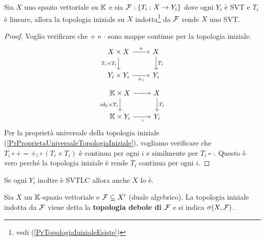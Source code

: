 \begin{proposition}\label{PrTopologiaInizialeCasoSVT}
Sia $X$ uno spazio vettoriale su $\mathbb{K}$ e sia $\mathcal{F}:\left\{{T_i:X\to Y_i}\right\}$ dove ogni $Y_i$ \`e SVT e $T_i$ \`e lineare, allora la topologia iniziale su $X$ indotta\footnote{vedi (\ref{PrTopologiaInizialeEsiste})} da $\mathcal{F}$ rende $X$ uno SVT.
\end{proposition}
\begin{proof}
Voglio verificare che $+$ e $\cdot$ sono mappe continue per la topologia iniziale.
\[\begin{tikzcd}
	{X\times X} & X \\
	{Y_i\times Y_i} & {Y_i}
	\arrow["{+}", from=1-1, to=1-2]
	\arrow["{T_i\times T_i}"', from=1-1, to=2-1]
	\arrow["{T_i}", from=1-2, to=2-2]
	\arrow["{+_i}"', from=2-1, to=2-2]
\end{tikzcd}\]
\[\begin{tikzcd}
	{\K\times X} & X \\
	{\K\times Y_i} & {Y_i}
	\arrow["\cdot", from=1-1, to=1-2]
	\arrow["{id_\K\times T_i}"', from=1-1, to=2-1]
	\arrow["{T_i}", from=1-2, to=2-2]
	\arrow["{\cdot_i}"', from=2-1, to=2-2]
\end{tikzcd}\]
Per la propriet\`a universale della topologia iniziale (\ref{PrProprietaUniversaleTopologiaIniziale}), vogliamo verificare che $T_i\circ +=+_i\circ (T_i\times T_i)$ \`e continua per ogni $i$ e similmente per $T_i\circ \cdot$. Questo \`e vero perch\'e la topologia iniziale \`e rende $T_i$ continua per ogni $i$.
\end{proof}

\begin{remark}
Se ogni $Y_i$ inoltre \`e SVTLC allora anche $X$ lo \`e.
\end{remark}


\begin{definition}
Sia $X$ un $\mathbb{K}$-spazio vettoriale e $\mathcal{F}\subseteq X'$ (duale algebrico). La topologia iniziale indotta da $\mathcal{F}$ viene detta la \textbf{topologia debole di $\mathcal{F}$} e si indica $\sigma(X,\mathcal{F})$.
\end{definition}


